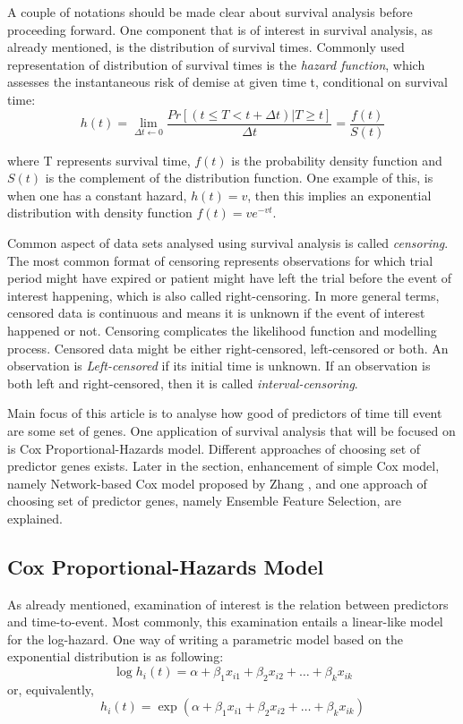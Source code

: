 \documentclass{ba-kecs}
\numberwithin{figure}{section}
\numberwithin{equation}{section}
\begin{document}
A couple of notations should be made clear about survival analysis before proceeding forward. One component that is of interest in survival analysis, as already mentioned, is the distribution of survival times. Commonly used representation of distribution of survival times is the \textit{hazard function}, which assesses the instantaneous risk of demise at given time t, conditional on survival time:
\begin{equation}
h(t) = \lim_{\Delta{t} \leftarrow 0} \dfrac{Pr[(t \leq T < t + \Delta{t})|T \geq t]}{\Delta{t}} = \dfrac{f(t)}{S(t)}
\end{equation}

where T represents survival time, $f(t)$ is the probability density function and $S(t)$ is the complement of the distribution function. One example of this, is when one has a constant hazard, $h(t) = v$, then this implies an exponential distribution with density function $f(t) = ve^{-vt}$.

Common aspect of data sets analysed using survival analysis is called \textit{censoring}. The most common format of censoring represents observations for which trial period might have expired or patient might have left the trial before the event of interest happening, which is also called right-censoring. In more general terms, censored data is continuous and means it is unknown if the event of interest happened or not. Censoring complicates the likelihood function and modelling process. Censored data might be either right-censored, left-censored or both. An observation is \textit{Left-censored} if its initial time is unknown. If an observation is both left and right-censored, then it is called \textit{interval-censoring}.

Main focus of this article is to analyse how good of predictors of time till event are some set of genes. One application of survival analysis that will be focused on is Cox Proportional-Hazards model. Different approaches of choosing set of predictor genes exists. Later in the section, enhancement of simple Cox model, namely Network-based Cox model proposed by Zhang \cite{netcox}, and one approach of choosing set of predictor genes, namely Ensemble Feature Selection, are explained.

\subsection{Cox Proportional-Hazards Model}
As already mentioned, examination of interest is the relation between predictors and time-to-event. Most commonly, this examination entails a linear-like model for the log-hazard. One way of writing a parametric model based on the exponential distribution is as following:
\begin{equation}
\log{h_{i}(t)} = \alpha + \beta_{1}x_{i1} + \beta_{2}x_{i2} + \hdots + \beta_{k}x_{ik}
\end{equation}
or, equivalently,
\begin{equation}
h_i(t) = \exp(\alpha + \beta_{1}x_{i1} + \beta_{2}x_{i2} + \hdots + \beta_{k}x_{ik})
\end{equation}
\end{document}
